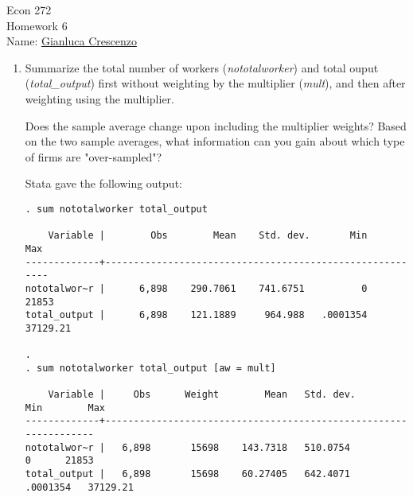 \documentclass[11pt,twoside,openany]{memoir}
\begin{document}
\begin{center}
{\large Econ 272 \\[0.1in]Homework 6 \\[0.1in]}
{Name:} {\underline{Gianluca Crescenzo\hspace*{2in}}}\\[0.15in]
\end{center}
\vspace{4pt}
\begin{question}
    \phantom{a}
    \begin{enumerate}[label = (\alph*),itemsep=1pt,topsep=3pt]
        \item Summarize the total number of workers (\textit{nototalworker}) and total ouput (\textit{total\_output}) first without weighting by the multiplier (\textit{mult}), and then after weighting using the multiplier.
        
        Does the sample average change upon including the multiplier weights? Based on the two sample averages, what information can you gain about which type of firms are "over-sampled"?
            {\color{blue} \begin{solution}
                Stata gave the following output:
                    \begin{Verbatim}[fontsize=\footnotesize]
. sum nototalworker total_output

    Variable |        Obs        Mean    Std. dev.       Min        Max
-------------+---------------------------------------------------------
nototalwor~r |      6,898    290.7061    741.6751          0      21853
total_output |      6,898    121.1889     964.988   .0001354   37129.21

. 
. sum nototalworker total_output [aw = mult]

    Variable |     Obs      Weight        Mean   Std. dev.       Min        Max
-------------+-----------------------------------------------------------------
nototalwor~r |   6,898       15698    143.7318   510.0754          0      21853
total_output |   6,898       15698    60.27405   642.4071   .0001354   37129.21


\end{Verbatim}
\end{solution}}
\end{enumerate}
\end{question}
\end{document}
